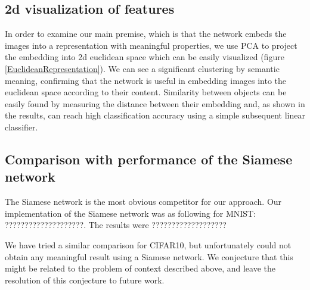\documentclass{article} %
\begin{document}
\subsection{2d visualization of features}
In order to examine our main premise, which is that the network embeds the images into a representation with meaningful properties, we
use PCA to project the embedding into 2d euclidean space which can be easily visualized (figure \ref{EuclideanRepresentation}).
We can see a significant clustering by semantic meaning, confirming that the network is useful in embedding
images into the euclidean space according to their content. 
 Similarity between objects can be easily found by  measuring the distance between their embedding and, as shown in the results, can reach high
classification accuracy using a simple subsequent linear classifier. 

\subsection{Comparison with performance of the Siamese network}
The Siamese network is the most obvious competitor for our approach.  Our implementation of the Siamese network was as following for MNIST:    ????????????????????.   The results were ??????????????????? 

We have tried a similar comparison for CIFAR10, but unfortunately could not obtain any meaningful result using a Siamese network.
We conjecture that this might be related to the problem of context described above, and leave the resolution of this 
conjecture to future work.
\end{document}
